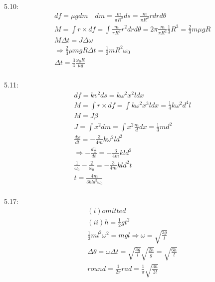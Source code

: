 \documentclass{article}
\begin{document}
5.10:
\begin{align*}
&df=\mu gdm\quad dm=\frac{m}{\pi R^2} ds=\frac{m}{\pi R^2} rdrd\theta \\
&M=\int r\times df=\int \frac{m}{\pi R^2}r^2 drd\theta=2\pi\frac{m}{\pi R^2}\frac13 R^3=\frac23m\mu gR \\
&M\Delta t=J \Delta \omega \\
&\Rightarrow \frac23 \mu mgR \Delta t=\frac12mR^2\omega_0 \\
&\Delta t=\frac34\frac{\omega_0R}{\mu g} \\
\end{align*}

5.11:
\begin{align*}
&df=kv^2 ds=k\omega^2 x^2 ldx \\
& M=\int r\times df=\int k\omega^2 x^3 ldx=\frac14k\omega^2 d^4l \\
&M=J\beta \\
&J=\int x^2 dm=\int x^2 \frac{m}{d}  dx=\frac13 md^2 \\
& \frac{d\omega}{dt}=-\frac3{4m} k\omega^2 l d^2 \\
&\Rightarrow -\frac{d\frac1{\omega}}{dt}=-\frac3{4m}k ld^2 \\
&\frac1{\omega_0}-\frac2{\omega_0}=-\frac3{4m}kld^2 t \\
&t=\frac{4m}{3kld^2\omega_0} \\
\end{align*}

5.17:
\begin{align*}
&(i) omitted \\
&(ii)h=\frac12gt^2 \\
&\frac13ml^2 \omega^2=mgl\Rightarrow \omega=\sqrt{\frac{3g}l} \\
&\Delta \theta =\omega \Delta t=\sqrt{\frac{3g}l}\sqrt{\frac{2h}g}=\sqrt{\frac{6h}l} \\
&round = \frac1{2\pi} rad =\frac1{\pi}\sqrt{\frac{3h}{2l}} \\
\end{align*}
\end{document}
